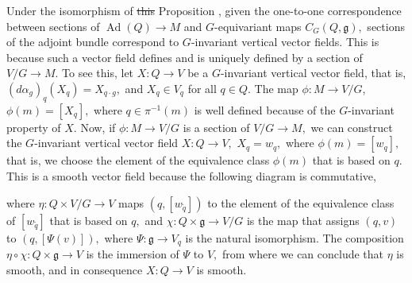 \documentclass[12pt, letterpaper, reqno]{amsart}
\theoremstyle{definition}
\theoremstyle{plain}
\theoremstyle{remark}
\providecommand{\DIFadd}[1]{{\protect\color{blue}\uwave{#1}}} %
\providecommand{\DIFdel}[1]{{\protect\color{red}\sout{#1}}}                      %
\providecommand{\DIFaddbegin}{} %
\providecommand{\DIFaddend}{} %
\providecommand{\DIFdelbegin}{} %
\providecommand{\DIFdelend}{} %
\newcommand{\DIFscaledelfig}{0.5}
\newlength{\DIFdelgraphicswidth} %
\newlength{\DIFdelgraphicsheight} %
\newcommand{\DIFaddincludegraphics}[2][]{{\color{blue}\fbox{\DIFOincludegraphics[#1]{#2}}}} %
\newcommand{\DIFdelincludegraphics}[2][]{%
\sbox{\DIFdelgraphicsbox}{\DIFOincludegraphics[#1]{#2}}%
\settoboxwidth{\DIFdelgraphicswidth}{\DIFdelgraphicsbox} %
\settoboxtotalheight{\DIFdelgraphicsheight}{\DIFdelgraphicsbox} %
\scalebox{\DIFscaledelfig}{%
\parbox[b]{\DIFdelgraphicswidth}{\usebox{\DIFdelgraphicsbox}\\[-\baselineskip] \rule{\DIFdelgraphicswidth}{0em}}\llap{\resizebox{\DIFdelgraphicswidth}{\DIFdelgraphicsheight}{%
\setlength{\unitlength}{\DIFdelgraphicswidth}%
\begin{picture}(1,1)%
\thicklines\linethickness{2pt} %
{\color[rgb]{1,0,0}\put(0,0){\framebox(1,1){}}}%
{\color[rgb]{1,0,0}\put(0,0){\line( 1,1){1}}}%
{\color[rgb]{1,0,0}\put(0,1){\line(1,-1){1}}}%
\end{picture}%
}\hspace*{3pt}}} %
} %
\DeclareRobustCommand{\DIFaddbegin}{\DIFOaddbegin \let\includegraphics\DIFaddincludegraphics} %
\DeclareRobustCommand{\DIFaddend}{\DIFOaddend \let\includegraphics\DIFOincludegraphics} %
\DeclareRobustCommand{\DIFdelbegin}{\DIFOdelbegin \let\includegraphics\DIFdelincludegraphics} %
\DeclareRobustCommand{\DIFdelend}{\DIFOaddend \let\includegraphics\DIFOincludegraphics} %
\begin{document}
Under the isomorphism of \DIFdelbegin \DIFdel{this }\DIFdelend Proposition \DIFaddbegin \DIFadd{\ref{prop:isomorphism_vb}}\DIFaddend , given the one-to-one correspondence between sections of $ \operatorname{Ad} (Q)\rightarrow M $ and $ G $-equivariant maps $ C_G(Q, \mathfrak{g}), $ sections of the adjoint bundle correspond to $ G $-invariant vertical vector fields. This is because such a vector field defines and is uniquely defined by a section of $ V/G \rightarrow M. $ To see this, let $ X: Q \rightarrow V $ be a $ G $-invariant vertical vector field, that is, $ (d\alpha_g)_q(X_q) = X_{q\cdot g}, $ and $ X_q\in V_q $ for all $ q\in Q. $ The map $ \phi: M \rightarrow V/G $, $ \phi(m)= [X_q], $ where $ q\in \pi^{-1}(m) $ is well defined because of the $ G $-invariant property of $ X. $ Now, if $ \phi: M \rightarrow V/G $ is a section of $ V/G \rightarrow M, $ we can construct the $ G $-invariant vertical vector field $ X: Q \rightarrow V, $ $ X_q=w_q, $ where $ \phi(m)=[w_q], $ that is, we choose the element of the equivalence class $ \phi(m) $ that is based on $ q. $ This is a smooth vector field because the following diagram is commutative,
\begin{center}
\end{center}
where $ \eta: Q\times V/G \rightarrow V $ maps $ (q, [w_{\tilde q}]) $ to the element of the equivalence class of $ [w_{\tilde q}] $ that is based on $ q, $ and $ \chi: Q\times\mathfrak{g}\rightarrow V/G $ is the map that assigns $(q,v)$ to $ (q, [\Psi(v)]), $ where $ \Psi: \mathfrak{g} \rightarrow V_q $ is the natural isomorphism. The composition $ \eta\circ\chi: Q\times \mathfrak{g} \rightarrow V $ is the immersion of $ \Psi $ to $ V, $ from where we can conclude that $ \eta $ is smooth, and in consequence $ X:Q \rightarrow V $ is smooth.
\end{document}

